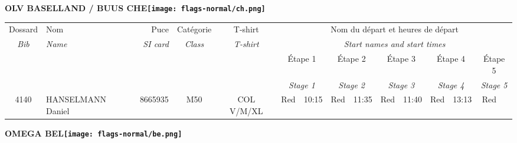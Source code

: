 \documentclass{report}
\begin{document}
\newpage
  \Huge \centering \bfseries OLV BASELLAND / BUUS  CHE\normalfont \footnotesize \sffamily \hfill \texttt{[image: flags-normal/ch.png]} \newline 
  \begin{longtable}{|c|l|r|c|c|*{5}{cc|}}
    Dossard & Nom  & Puce    & Catégorie & T-shirt & \multicolumn{10}{c|}{Nom du départ et heures de départ} \\
    \itshape Bib     & \itshape Name & \itshape SI card & \itshape Class  & \itshape  T-shirt  & \multicolumn{10}{c|}{\itshape Start names and start times} \\
    \hline
    & & & & & \multicolumn{2}{c|}{Étape 1} & \multicolumn{2}{c|}{Étape 2} & \multicolumn{2}{c|}{Étape 3} & \multicolumn{2}{c|}{Étape 4} & \multicolumn{2}{c|}{Étape 5} \\
    & & & & & \multicolumn{2}{c|}{\itshape Stage 1} & \multicolumn{2}{c|}{\itshape Stage 2} & \multicolumn{2}{c|}{\itshape Stage 3} & \multicolumn{2}{c|}{\itshape Stage 4} & \multicolumn{2}{c|}{\itshape Stage 5} \\
    \hline
    4140 & HANSELMANN Daniel & 8665935 & M50 & COL V/M/XL & Red & 10:15 & Red & 11:35 & Red & 11:40 & Red & 13:13 & Red &  \\
  \end{longtable}
\newpage
  \Huge \centering \bfseries OMEGA  BEL\normalfont \footnotesize \sffamily \hfill \texttt{[image: flags-normal/be.png]} \newline 
\end{document}
